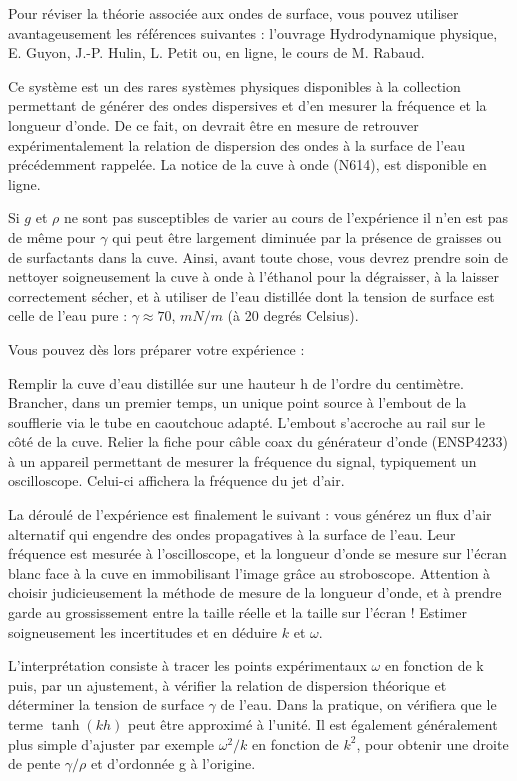 \documentclass{article}%
\begin{document}
Pour réviser la théorie associée aux ondes de surface, vous pouvez utiliser avantageusement les références suivantes : l'ouvrage Hydrodynamique physique, E. Guyon, J.-P. Hulin, L. Petit ou, en ligne, le cours de M. Rabaud. 

Ce système est un des rares systèmes physiques disponibles à la collection permettant de générer des ondes dispersives et d'en mesurer la fréquence et la longueur d'onde. De ce fait, on devrait être en mesure de retrouver expérimentalement la relation de dispersion des ondes à la surface de l'eau précédemment rappelée. La notice de la cuve à onde (N614), est disponible en ligne.

Si $g$ et $\rho$ ne sont pas susceptibles de varier au cours de l'expérience il n'en est pas de même pour $\gamma$ qui peut être largement diminuée par la présence de graisses ou de surfactants dans la cuve. Ainsi, avant toute chose, vous devrez prendre soin de nettoyer soigneusement la cuve à onde à l'éthanol pour la dégraisser, à la laisser correctement sécher, et à utiliser de l'eau distillée dont la tension de surface est celle de l'eau pure : $\gamma \approx 70 $, $mN/m$ (à 20 degrés Celsius).

Vous pouvez dès lors préparer votre expérience :

    Remplir la cuve d'eau distillée sur une hauteur h de l'ordre du centimètre.
    Brancher, dans un premier temps, un unique point source à l'embout de la soufflerie via le tube en caoutchouc adapté. L'embout s'accroche au rail sur le côté de la cuve.
    Relier la fiche pour câble coax du générateur d'onde (ENSP4233) à un appareil permettant de mesurer la fréquence du signal, typiquement un oscilloscope. Celui-ci affichera la fréquence du jet d'air.

La déroulé de l'expérience est finalement le suivant : vous générez un flux d'air alternatif qui engendre des ondes propagatives à la surface de l'eau. Leur fréquence est mesurée à l'oscilloscope, et la longueur d'onde se mesure sur l'écran blanc face à la cuve en immobilisant l'image grâce au stroboscope. Attention à choisir judicieusement la méthode de mesure de la longueur d'onde, et à prendre garde au grossissement entre la taille réelle et la taille sur l'écran ! Estimer soigneusement les incertitudes et en déduire $k$ et $\omega$.

L'interprétation consiste à tracer les points expérimentaux $\omega$ en fonction de k puis, par un ajustement, à vérifier la relation de dispersion théorique et déterminer la tension de surface $\gamma$ de l'eau. Dans la pratique, on vérifiera que le terme $\tanh(kh)$ peut être approximé à l'unité. Il est également généralement plus simple d'ajuster par exemple $\omega^2/k$ en fonction de $k^2$, pour obtenir une droite de pente $\gamma/\rho$ et d'ordonnée g à l'origine.
\end{document}
